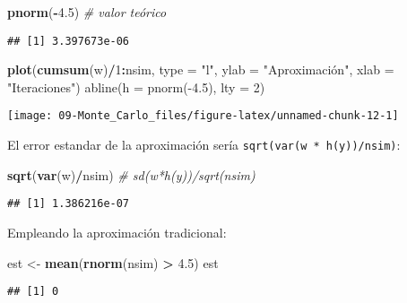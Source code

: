 \documentclass[
]{book}
\newenvironment{Shaded}{\begin{snugshade}}{\end{snugshade}}
\newcommand{\CommentTok}[1]{\textcolor[rgb]{0.56,0.35,0.01}{\textit{#1}}}
\newcommand{\DataTypeTok}[1]{\textcolor[rgb]{0.13,0.29,0.53}{#1}}
\newcommand{\DecValTok}[1]{\textcolor[rgb]{0.00,0.00,0.81}{#1}}
\newcommand{\FloatTok}[1]{\textcolor[rgb]{0.00,0.00,0.81}{#1}}
\newcommand{\KeywordTok}[1]{\textcolor[rgb]{0.13,0.29,0.53}{\textbf{#1}}}
\newcommand{\NormalTok}[1]{#1}
\newcommand{\OperatorTok}[1]{\textcolor[rgb]{0.81,0.36,0.00}{\textbf{#1}}}
\newcommand{\StringTok}[1]{\textcolor[rgb]{0.31,0.60,0.02}{#1}}
\theoremstyle{break}
\theoremstyle{definition}
\theoremstyle{definition}
\theoremstyle{definition}
\theoremstyle{remark}
\begin{document}
\begin{Shaded}
\begin{Highlighting}[]
\KeywordTok{pnorm}\NormalTok{(}\OperatorTok{-}\FloatTok{4.5}\NormalTok{)  }\CommentTok{# valor teórico}
\end{Highlighting}
\end{Shaded}

\begin{verbatim}
## [1] 3.397673e-06
\end{verbatim}

\begin{Shaded}
\begin{Highlighting}[]
\KeywordTok{plot}\NormalTok{(}\KeywordTok{cumsum}\NormalTok{(w)}\OperatorTok{/}\DecValTok{1}\OperatorTok{:}\NormalTok{nsim, }\DataTypeTok{type =} \StringTok{"l"}\NormalTok{, }\DataTypeTok{ylab =} \StringTok{"Aproximación", xlab = "}\NormalTok{Iteraciones}\StringTok{")}
\StringTok{abline(h = pnorm(-4.5), lty = 2)}
\end{Highlighting}
\end{Shaded}

\begin{center}\texttt{[image: 09-Monte\_Carlo\_files/figure-latex/unnamed-chunk-12-1]} \end{center}

El error estandar de la aproximación sería \texttt{sqrt(var(w\ *\ h(y))/nsim)}:

\begin{Shaded}
\begin{Highlighting}[]
\KeywordTok{sqrt}\NormalTok{(}\KeywordTok{var}\NormalTok{(w)}\OperatorTok{/}\NormalTok{nsim) }\CommentTok{# sd(w*h(y))/sqrt(nsim)   }
\end{Highlighting}
\end{Shaded}

\begin{verbatim}
## [1] 1.386216e-07
\end{verbatim}

Empleando la aproximación tradicional:

\begin{Shaded}
\begin{Highlighting}[]
\NormalTok{est <-}\StringTok{ }\KeywordTok{mean}\NormalTok{(}\KeywordTok{rnorm}\NormalTok{(nsim) }\OperatorTok{>}\StringTok{ }\FloatTok{4.5}\NormalTok{)}
\NormalTok{est}
\end{Highlighting}
\end{Shaded}

\begin{verbatim}
## [1] 0
\end{verbatim}
\end{document}
